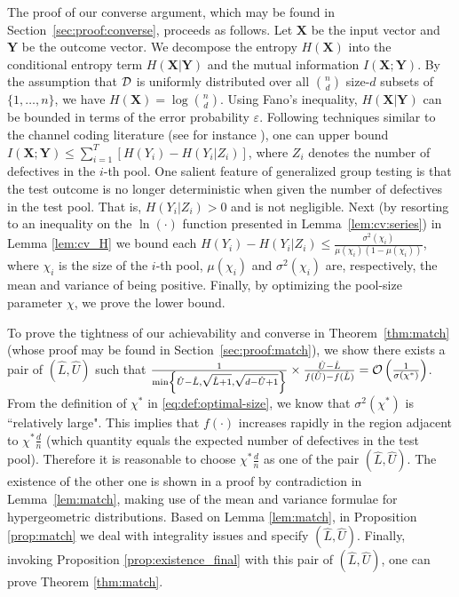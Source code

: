 \documentclass[onecolumn,letterpaper]{IEEEtran}
\newcommand{\cD}{{\cal D}}
\newcommand{\cO}{{\cal O}}
\newcommand{\cx}{{X}}
\newcommand{\cy}{{Y}}
\newcommand{\etp}{{H}}
\newcommand{\mi}{{I}}
\newcommand{\cA}{{Z}}
\newcommand{\na}{{a}}
\newcommand{\plsize}{{\chi}}
\newcommand{\mean}{{\mu}}
\newcommand{\var}{{\sigma^{2}}}
\newcommand{\lwm}{{\hat{L}}}
\newcommand{\upm}{{\hat{U}}}
\newcommand{\nod}{{\cA_i}}
\begin{document}
 The proof of our converse argument, which may be found in Section~\ref{sec:proof:converse}, proceeds as follows.
Let $\boldsymbol{\cx}$ be the input vector and $\boldsymbol{\cy}$ be the outcome vector. We decompose the entropy $H(\boldsymbol{\cx})$ into the conditional entropy term $H(\boldsymbol{\cx}|\boldsymbol{\cy})$ and the mutual information $I(\boldsymbol{\cx};\boldsymbol{\cy})$. By the assumption that $\cD$ is uniformly distributed over all $\binom{n}{d}$ size-$d$ subsets of $\{1,\ldots,n\}$, we have $H(\boldsymbol{\cx})=\log \binom{n}{d}$. Using Fano's inequality, $H(\boldsymbol{\cx}|\boldsymbol{\cy})$ can be bounded in terms of the error probability $\varepsilon$. Following techniques similar to the channel coding literature  (see for instance \cite[Sec. 7.3]{yeung08}), one can upper bound $\mi(\boldsymbol{\cx};\boldsymbol{\cy}) \le \sum_{i=1}^{T} [\etp(\cy_i) - \etp(\cy_i|\cA_i)]$, where $\nod$ denotes the number of defectives in the $i$-th pool. One salient feature of generalized group testing is that the test outcome is no longer deterministic when given the number of defectives in the test pool. That is, $\etp(\cy_i|\cA_i)>0$ and is not negligible. 
Next (by resorting to an inequality on the $\ln(\cdot)$ function presented in Lemma~\ref{lem:cv:series}) in Lemma \ref{lem:cv_H} we bound each $\etp(\cy_i) - \etp(\cy_i|\cA_i) \le \frac{\var(\plsize_i)}{\mean(\plsize_i)(1-\mean(\plsize_i))}$, where $\plsize_i$ is the size of the $i$-th pool, $\mean(\plsize_i)$ and $\var(\plsize_i)$ are, respectively, the mean and variance of being positive. Finally, by optimizing the pool-size parameter $\plsize$, we prove the lower bound. 



To prove the tightness of our achievability and converse in Theorem~\ref{thm:match} (whose proof may be found in Section~\ref{sec:proof:match}), we show there exists a pair of $(\lwm,\upm)$ such that $\frac{1}{\min\left\{\upm-\lwm , \sqrt{\lwm+1} , \sqrt{d-\upm+1}\right\}}\times \frac{\upm-\lwm}{f(\upm)-f(\lwm)} = \cO \left( \frac{1}{\sigma(\plsize^{*})} \right)$. From the definition of $\plsize^*$ in \eqref{eq:def:optimal-size}, we know that $\var(\plsize^*)$ is ``relatively large". This implies that $f(\cdot)$ increases rapidly in the region adjacent to $\plsize^* \frac{d}{n}$ (which quantity equals the expected number of defectives in the test pool). Therefore it is reasonable to choose $\plsize^* \frac{d}{n}$ as one of the pair $(\lwm,\upm)$. The existence of the other one is shown in a proof by contradiction in Lemma~\ref{lem:match},  making use of the mean and variance formulae for hypergeometric distributions. Based on Lemma \ref{lem:match}, in Proposition \ref{prop:match} we deal with integrality issues and specify $(\lwm,\upm)$. Finally, invoking  Proposition \ref{prop:existence_final} with this pair of $(\lwm,\upm)$, one can prove Theorem \ref{thm:match}.
\end{document}

